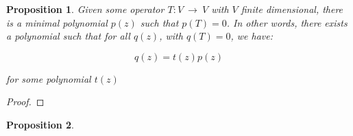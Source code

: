 \documentclass[10pt, oneside]{article}
\newtheorem{prop}{Proposition}
\begin{document}
    \begin{prop}
      Given some operator $T : V \ \rightarrow \ V$ with $V$ finite dimensional, there is a minimal polynomial $p(z)$ such that
      $p(T) = 0$. In other words, there exists a polynomial such that for all $q(z)$, with $q(T) = 0$, we have:

      $$q(z) = t(z) p(z)$$

      for some polynomial $t(z)$
    \end{prop}

    \begin{proof}

    \end{proof}

    \begin{prop}
      
      \end{prop}

    
\end{document}
